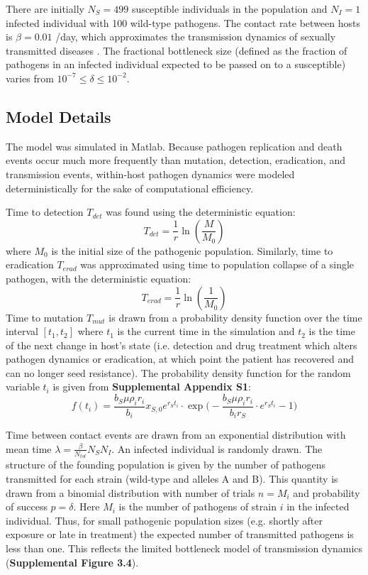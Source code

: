 \documentclass{article}
\begin{document}
There are initially $N_S=499$ susceptible individuals in the population and $N_I=1$ infected individual with 100 wild-type pathogens.  The contact rate between hosts is $\beta = 0.01$ /day, which approximates the transmission dynamics of sexually transmitted diseases \cite{5}.  The fractional bottleneck size (defined as the fraction of pathogens in an infected individual expected to be passed on to a susceptible) varies from $10^{-7} \leq \delta \leq 10^{-2}$.

\subsection{Model Details}

The model was simulated in Matlab.  Because pathogen replication and death events occur much more frequently than mutation, detection, eradication, and transmission events, within-host pathogen dynamics were modeled deterministically for the sake of computational efficiency.  

Time to detection $T_{det}$ was found using the deterministic equation:
\begin{equation}
T_{det} = \frac{1}{r} \ln(\frac{M}{M_0})
\end{equation}
where $M_0$ is the initial size of the pathogenic population.  Similarly, time to eradication $T_{erad}$ was approximated using time to population collapse of a single pathogen, with the deterministic equation:
\begin{equation}
T_{erad} = \frac{1}{r} \ln(\frac{1}{M_0})
\end{equation}
Time to mutation $T_{mut}$ is drawn from a probability density function over the time interval $[t_1,t_2]$ where $t_1$ is the current time in the simulation and $t_2$ is the time of the next change in host's state (i.e. detection and drug treatment which alters pathogen dynamics or eradication, at which point the patient has recovered and can no longer seed resistance).  The probability density function for the random variable $t_{i}$ is given from \textbf{Supplemental Appendix S1}:
\begin{equation}
f(t_{i}) = \frac{b_S \mu \rho_i r_i}{b_i} x_{S,0} e^{r_S t_{i}} \cdot \exp \big(-\frac{b_S \mu \rho_i r_i}{b_i r_S} \cdot e^{r_S t_{i}} -1 \big)
\end{equation}

Time between contact events are drawn from an exponential distribution with mean time $\lambda = \frac{\beta}{N_{tot}} N_S N_I$.  An infected individual is randomly drawn.  The structure of the founding population is given by the number of pathogens transmitted for each strain (wild-type and alleles A and B).  This quantity is drawn from a binomial distribution with number of trials $n=M_i$ and probability of success $p=\delta$.  Here $M_i$ is the number of pathogens of strain $i$ in the infected individual.  Thus, for small pathogenic population sizes (e.g. shortly after exposure or late in treatment) the expected number of transmitted pathogens is less than one.  This reflects the limited bottleneck model of transmission dynamics \cite{6} (\textbf{Supplemental Figure 3.4}).
\end{document}
